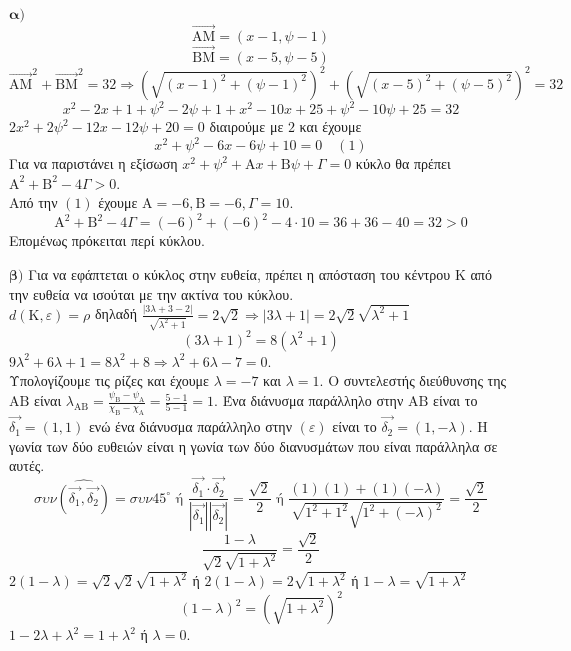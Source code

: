 \textbf{$\boldsymbol{\alpha})$}
\quad {}
\[ \overrightarrow{\mathrm{AM}}=(x-1, \psi-1) \]
\[ \overrightarrow{\mathrm{BM}}=(x-5, \psi-5) \]
\[ \overrightarrow{\mathrm{AM}}^{2}+\overrightarrow{\mathrm{BM}}^{2}=32 \Rightarrow \left(\sqrt{(x-1)^{2}+(\psi-1)^{2}}\right)^{2}+\left(\sqrt{(x-5)^{2}+(\psi-5)^{2}}\right)^{2}=32 \]
\[ x^{2}-2x+1+\psi^{2}-2\psi+1+x^{2}-10x+25+\psi^{2}-10\psi+25=32 \]
$2x^{2}+2\psi^{2}-12x-12\psi+20=0$ διαιρούμε με $2$ και έχουμε
\[ x^{2}+\psi^{2}-6x-6\psi+10=0 \quad (1) \]
\quad {} Για να παριστάνει η εξίσωση $x^{2}+\psi^{2}+\mathrm{A}x+\mathrm{B}\psi+\Gamma=0$ κύκλο θα πρέπει $\mathrm{A}^{2}+\mathrm{B}^{2}-4\Gamma>0$. \\
Από την $(1)$ έχουμε $\mathrm{A}=-6, \mathrm{B}=-6, \Gamma=10$.
\[ \mathrm{A}^{2}+\mathrm{B}^{2}-4\Gamma=(-6)^{2}+(-6)^{2}-4\cdot 10 = 36+36-40=32>0 \]
Επομένως πρόκειται περί κύκλου.

\textbf{$\boldsymbol{\beta})$}
\quad {} Για να εφάπτεται ο κύκλος στην ευθεία, πρέπει η απόσταση του κέντρου $\mathrm{K}$ από την ευθεία να ισούται με την ακτίνα του κύκλου. \\
$d(\mathrm{K},\varepsilon)=\rho$ δηλαδή $\frac{|3\lambda+3-2|}{\sqrt{\lambda^{2}+1}} = 2\sqrt{2} \Rightarrow |3\lambda+1|=2\sqrt{2}\sqrt{\lambda^{2}+1}$
\[ (3\lambda+1)^{2}=8(\lambda^{2}+1) \]
$9\lambda^{2}+6\lambda+1=8\lambda^{2}+8 \Rightarrow \lambda^{2}+6\lambda-7=0$. \\
Υπολογίζουμε τις ρίζες και έχουμε $\lambda=-7$ και $\lambda=1$.
\quad {} Ο συντελεστής διεύθυνσης της $\mathrm{AB}$ είναι $\lambda_{\mathrm{AB}}=\frac{\psi_{\mathrm{B}}-\psi_{\mathrm{A}}}{\chi_{\mathrm{B}}-\chi_{\mathrm{A}}}=\frac{5-1}{5-1}=1$. Ένα διάνυσμα παράλληλο στην $\mathrm{AB}$ είναι το $\vec{\delta_{1}}=(1,1)$ ενώ ένα διάνυσμα παράλληλο στην $(\varepsilon)$ είναι το $\vec{\delta_{2}}=(1,-\lambda)$. Η γωνία των δύο ευθειών είναι η γωνία των δύο διανυσμάτων που είναι παράλληλα σε αυτές.
\[ \sigma\upsilon\nu\widehat{\left(\vec{\delta_{1}},\vec{\delta_{2}}\right)}=\sigma\upsilon\nu 45^{\circ} \text{ ή } \frac{\vec{\delta_{1}}\cdot\vec{\delta_{2}}}{|\vec{\delta_{1}}||\vec{\delta_{2}}|}=\frac{\sqrt{2}}{2} \text{ ή } \frac{(1)(1)+(1)(-\lambda)}{\sqrt{1^{2}+1^{2}}\sqrt{1^{2}+(-\lambda)^{2}}}=\frac{\sqrt{2}}{2} \]
\[ \frac{1-\lambda}{\sqrt{2}\sqrt{1+\lambda^{2}}}=\frac{\sqrt{2}}{2} \]
$2(1-\lambda)=\sqrt{2}\sqrt{2}\sqrt{1+\lambda^{2}}$ ή $2(1-\lambda)=2\sqrt{1+\lambda^{2}}$ ή $1-\lambda=\sqrt{1+\lambda^{2}}$
\[ (1-\lambda)^{2}=(\sqrt{1+\lambda^{2}})^{2} \]
$1-2\lambda+\lambda^{2}=1+\lambda^{2}$ ή $\lambda=0$.